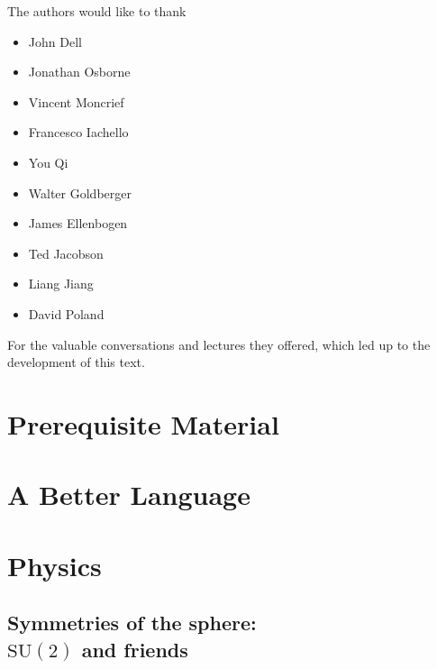 \documentclass[12pt, twoside, openany]{book}
\newcommand{\1}{\mathbbm{1}}
\begin{document}
\begin{large}
	The authors would like to thank 
	\begin{itemize}
		\item John Dell
		\item Jonathan Osborne
		\item Vincent Moncrief
		\item Francesco Iachello
		\item You Qi
		\item Walter Goldberger
		\item James Ellenbogen
		\item Ted Jacobson
		\item Liang Jiang
		\item David Poland
	\end{itemize}
	For the valuable conversations and lectures they offered, which led up to the development of this text.
\end{large}






\part{Prerequisite Material}









\part{A Better Language}\thispagestyle{empty}









\part{Physics}\thispagestyle{empty}

\chapter[Symmetries of the sphere: $\mathrm{SU}(2)$ and friends]{Symmetries of the sphere: \\$\mathrm{SU}(2)$ and friends}
\end{document}
